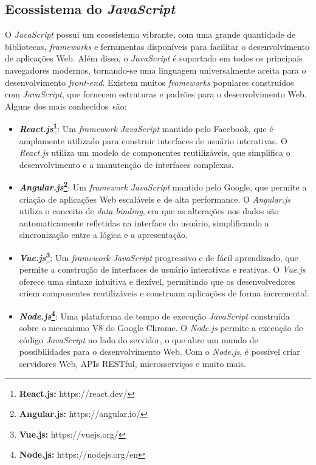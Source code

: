 \subsection{Ecossistema do \textit{JavaScript}}

O \textit{JavaScript} possui um ecossistema vibrante, com uma grande quantidade de bibliotecas, \textit{frameworks} e ferramentas disponíveis para facilitar o desenvolvimento de aplicações Web. Além disso, o \textit{JavaScript} é suportado em todos os principais navegadores modernos, tornando-se uma linguagem universalmente aceita para o desenvolvimento \textit{front-end}. Existem muitos \textit{frameworks} populares construídos com \textit{JavaScript}, que fornecem estruturas e padrões para o desenvolvimento Web. Alguns dos mais conhecidos~são:

\begin{itemize}
\item \textbf{\textit{React.js}\footnote{\textbf{React.js:} https://react.dev/}}: Um \textit{framework} \textit{JavaScript} mantido pelo Facebook, que é amplamente utilizado para construir interfaces de usuário interativas. O \textit{React.js} utiliza um modelo de componentes reutilizáveis, que simplifica o desenvolvimento e a manutenção de interfaces complexas.

\item \textbf{\textit{Angular.js}\footnote{\textbf{Angular.js:} https://angular.io/}}: Um \textit{framework} \textit{JavaScript} mantido pelo Google, que permite a criação de aplicações Web escaláveis e de alta performance. O \textit{Angular.js} utiliza o conceito de \textit{data binding}, em que as alterações nos dados são automaticamente refletidas na interface do usuário, simplificando a sincronização entre a lógica e a apresentação.

\item \textbf{ \textit{Vue.js}\footnote{\textbf{Vue.js:} https://vuejs.org/}}: Um \textit{framework} \textit{JavaScript} progressivo e de fácil aprendizado, que permite a construção de interfaces de usuário interativas e reativas. O \textit{Vue.js} oferece uma sintaxe intuitiva e flexível, permitindo que os desenvolvedores criem componentes reutilizáveis e construam aplicações de forma incremental.

\item \textbf{ \textit{Node.js}\footnote{\textbf{Node.js:} https://nodejs.org/en}}: Uma plataforma de tempo de execução \textit{JavaScript} construída sobre o mecanismo V8 do Google Chrome. O \textit{Node.js} permite a execução de código \textit{JavaScript} no lado do servidor, o que abre um mundo de possibilidades para o desenvolvimento Web. Com o \textit{Node.js}, é possível criar servidores Web, APIs RESTful, microsserviços e muito mais.
\end{itemize}

